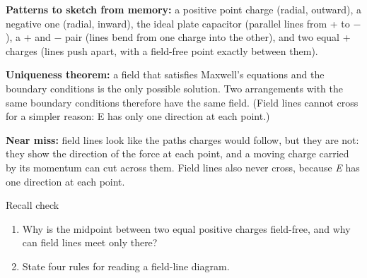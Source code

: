 \documentclass[11pt]{article}
\begin{document}
\begin{keepsection}
\textbf{Patterns to sketch from memory:} a positive point charge (radial, outward), a negative one (radial, inward), the ideal plate capacitor (parallel lines from + to \ensuremath{-}), a + and \ensuremath{-} pair (lines bend from one charge into the other), and two equal + charges (lines push apart, with a field-free point exactly between them).

\textbf{Uniqueness theorem:} a field that satisfies Maxwell’s equations and the boundary conditions is the only possible solution. Two arrangements with the same boundary conditions therefore have the same field. (Field lines cannot cross for a simpler reason: E has only one direction at each point.)

\begin{notebox}\textbf{Near miss:} field lines look like the paths charges would follow, but they are not: they show the direction of the force at each point, and a moving charge carried by its momentum can cut across them. Field lines also never cross, because \textit{E} has one direction at each point.\end{notebox}

\begin{recallbox}{Recall check}
\begin{enumerate}
\item Why is the midpoint between two equal positive charges field-free, and why can field lines meet only there?
\item State four rules for reading a field-line diagram.
\end{enumerate}

\end{recallbox}
\end{keepsection}
\end{document}

